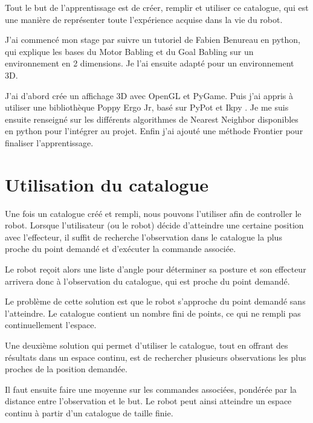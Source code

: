 \documentclass[11pt,french]{report}
\begin{document}
Tout le but de l'apprentissage est de créer, remplir et utiliser ce catalogue, qui est une manière de représenter toute l'expérience acquise dans la vie du robot.

\phantom{INVISIBLE LINE}

J'ai commencé mon stage par suivre un tutoriel \cite{TutoGoalBabling} de Fabien Benureau en python, qui explique les bases du Motor Babling et du Goal Babling sur un environnement en 2 dimensions.
Je l'ai ensuite adapté pour un environnement 3D.

J'ai d'abord crée un affichage 3D avec OpenGL et PyGame.
Puis j'ai appris à utiliser une bibliothèque Poppy Ergo Jr, basé sur PyPot \cite{PyPot} et Ikpy \cite{IKPy}.
Je me suis ensuite renseigné sur les différents algorithmes de Nearest Neighbor disponibles en python pour l'intégrer au projet.
Enfin j'ai ajouté une méthode Frontier \cite{Frontier} pour finaliser l'apprentissage.

\pagebreak
\section{Utilisation du catalogue}

Une fois un catalogue créé et rempli, nous pouvons l'utiliser afin de controller le robot.
Lorsque l'utilisateur (ou le robot) décide d'atteindre une certaine position avec l'effecteur, il suffit de recherche l'observation dans le catalogue la plus proche du point demandé et d'exécuter la commande associée.

Le robot reçoit  alors une liste d'angle pour déterminer sa posture et son effecteur arrivera donc à l'observation du catalogue, qui est proche du point demandé.

\phantom{INVISIBLE LINE}

Le problème de cette solution est que le robot s'approche du point demandé sans l'atteindre.
Le catalogue contient un nombre fini de points, ce qui ne rempli pas continuellement l'espace.

Une deuxième solution qui permet d'utiliser le catalogue, tout en offrant des résultats dans un espace continu, est de rechercher plusieurs observations les plus proches de la position demandée.

Il faut ensuite faire une moyenne sur les commandes associées, pondérée par la distance entre l'observation et le but.
Le robot peut ainsi atteindre un espace continu à partir d'un catalogue de taille finie.

\phantom{INVISIBLE LINE}
\end{document}
